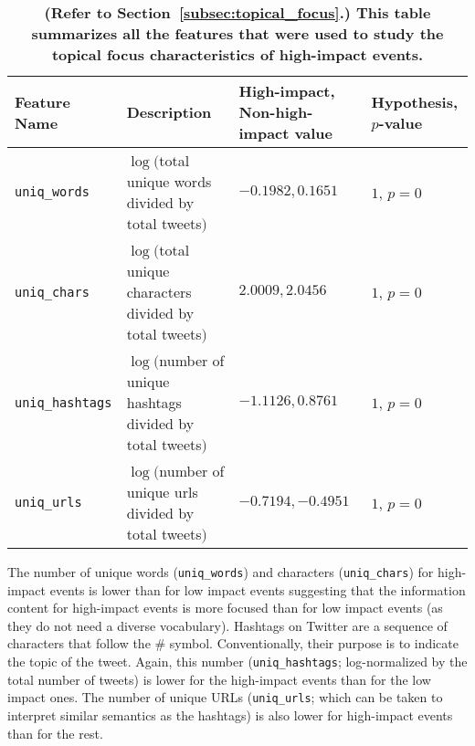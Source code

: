 \begin{table}
  \centering
  {\scriptsize
    \begin{tabular}{llll}
      \toprule
      Feature Name &  \multicolumn{1}{l}{Description} & High-impact, Non-high-impact value & Hypothesis, $p$-value\\
      \midrule
      \texttt{uniq\_words} & \pbox{20cm}{$\log($total unique words \\divided by total tweets$)$} & $-0.1982, 0.1651$ & $1$, $p = 0$ \\
      \midrule
      \texttt{uniq\_chars} & \pbox{20cm}{$\log($total unique characters \\divided by total tweets$)$} & $2.0009, 2.0456$ & $1$, $p = 0$ \\
      \midrule
      \texttt{uniq\_hashtags} & \pbox{20cm}{$\log($number of unique hashtags\\ divided by total tweets$)$} & $-1.1126, 0.8761$ & $1$, $p = 0$ \\
      \midrule
      \texttt{uniq\_urls} & \pbox{20cm}{$\log($number of unique urls \\divided by total tweets$)$} & $-0.7194, -0.4951$ & $1$, $p = 0$ \\
      \bottomrule
    \end{tabular}
  }
  \caption{\textbf{(Refer to Section~\ref{subsec:topical_focus}.)
      This table summarizes all the features that were used to study the topical focus characteristics
      of high-impact events.}}
  \label{tab:topical_focus}
\end{table}

The number of unique words (\texttt{uniq\_words}) and characters
(\texttt{uniq\_chars}) for high-impact events is lower than for low
impact events suggesting that the information content for high-impact
events is more focused than for low impact events (as they do not need
a diverse vocabulary). Hashtags on Twitter are a sequence of
characters that follow the \# symbol. Conventionally, their purpose is
to indicate the topic of the tweet. Again, this number
(\texttt{uniq\_hashtags}; log-normalized by the total number of
tweets) is lower for the high-impact events than for the low impact
ones. The number of unique URLs (\texttt{uniq\_urls}; which can be
taken to interpret similar semantics as the hashtags) is also lower
for high-impact events than for the rest. 

